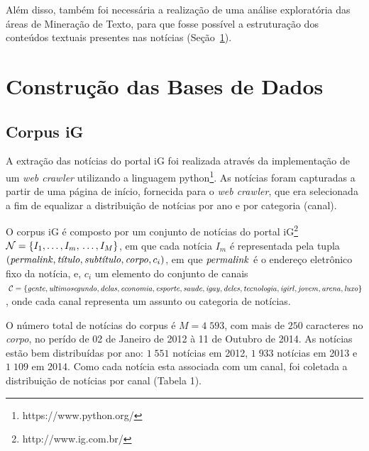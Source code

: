 \documentclass[
    12pt,                %
    oneside,            %
    a4paper,            %
    english,            %
    brazil                %
    ]{abntex2ppgsi}
\begin{document}
Além disso, também foi necessária a realização de uma análise exploratória das áreas de Mineração de Texto, para que fosse possível a estruturação dos conteúdos textuais presentes nas notícias (Seção~\ref{sec:basesig}).

\section{Construção das Bases de Dados}
\label{sec:basesig}

\subsection{Corpus iG}
\label{subsec:corpusig}

A extração das notícias do portal iG foi realizada através da implementação de um \textit{web crawler} utilizando a linguagem python\footnote{https://www.python.org/}.
As notícias foram capturadas a partir de uma página de início, fornecida para o \textit{web crawler}, que era selecionada a fim de equalizar a distribuição de notícias por ano e por categoria (canal).

O corpus iG é composto por um conjunto de notícias do portal iG\footnote{http://www.ig.com.br/} $\mathcal{N} = \{ I_1, \dots, I_m,\\ \dots, I_M \}$, em que cada notícia $I_m$ é representada pela tupla $(\text{\textit{permalink}}, \text{\textit{título}}, \text{\textit{subtítulo}}, \text{\textit{corpo}},\\ c_i)$, em que $\text{\textit{permalink}}$ é o endereço eletrônico fixo da notícia, e, $c_i$ um elemento do conjunto de canais $\;\mathcal{C} = \{ \text{\textit{gente}}, \text{\textit{ultimosegundo}}, \text{\textit{delas}}, \text{\textit{economia}}, \text{\textit{esporte}}, \text{\textit{saude}}, \text{\textit{igay}}, \text{\textit{deles}},\\ \text{\textit{tecnologia}}, \text{\textit{igirl}}, \text{\textit{jovem}}, \text{\textit{arena}}, \text{\textit{luxo}} \}$, onde cada canal representa um assunto ou categoria de notícias.

O número total de notícias do corpus é $M = 4\;593$, com mais de $250$ caracteres no \textit{corpo}, no perído de 02 de Janeiro de 2012 à 11 de Outubro de 2014. As notícias estão bem distribuídas por ano: $1\;551$ notícias em 2012, $1\;933$ notícias em 2013 e $1\;109$ em 2014. Como cada notícia esta associada com um canal, foi coletada a distribuição de notícias por canal (Tabela 1).
\end{document}
